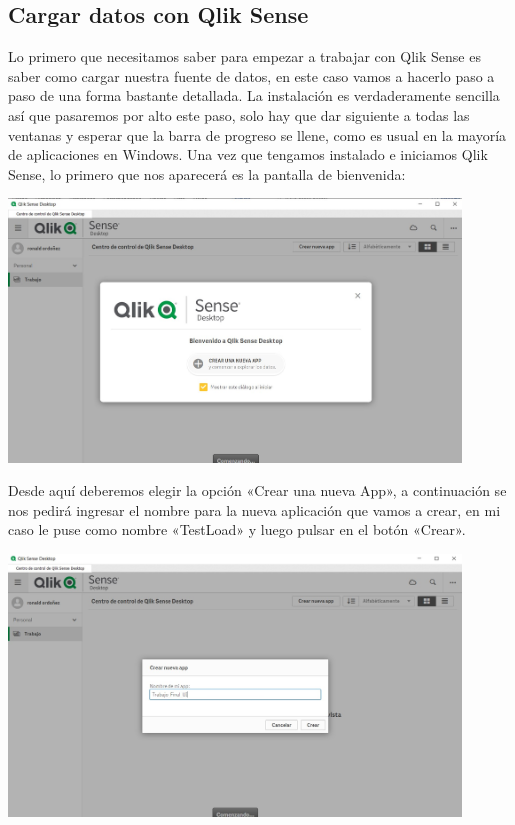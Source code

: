 \subsection{Cargar datos con Qlik Sense}

Lo primero que necesitamos saber para empezar a trabajar con Qlik Sense es saber como cargar nuestra fuente de datos, en este caso vamos a hacerlo paso a paso de una forma bastante detallada. La instalación es verdaderamente sencilla así que pasaremos por alto este paso, solo hay que dar siguiente a todas las ventanas y esperar que la barra de progreso se llene, como es usual en la mayoría de aplicaciones en Windows.
Una vez que tengamos instalado e iniciamos Qlik Sense, lo primero que nos aparecerá es la pantalla de bienvenida:


\begin{center}
	\includegraphics[width=12cm]{./Imagenes/img8} 
\end{center}

Desde aquí deberemos elegir la opción «Crear una nueva App», a continuación se nos pedirá ingresar el nombre para la nueva aplicación que vamos a crear, en mi caso le puse como nombre «TestLoad» y luego pulsar en el botón «Crear».

\begin{center}
	\includegraphics[width=12cm]{./Imagenes/img9} 
\end{center}

